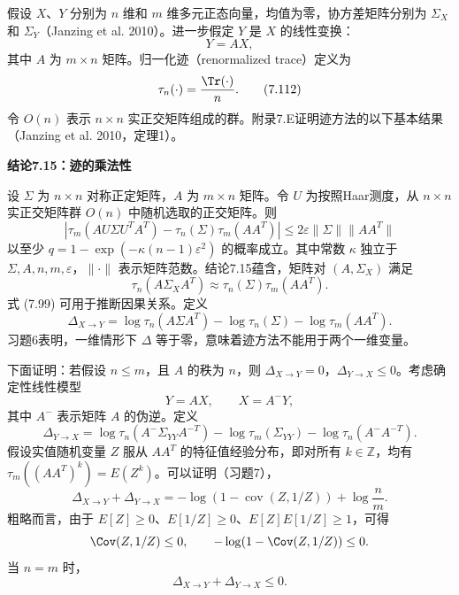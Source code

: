 假设 $X$、$Y$ 分别为 $n$ 维和 $m$ 维多元正态向量，均值为零，协方差矩阵分别为 $\Sigma_X$ 和 $\Sigma_Y$（Janzing et al. 2010）。进一步假定 $Y$ 是 $X$ 的线性变换：
\begin{equation}
Y=AX,
\tag{7.111}
\end{equation}
其中 $A$ 为 $m\times n$ 矩阵。归一化迹（renormalized trace）定义为
\begin{equation}
\tau_n(\cdot)=\frac{\Tr(\cdot)}n.
\tag{7.112}
\end{equation}
令 $O(n)$ 表示 $n\times n$ 实正交矩阵组成的群。附录7.E证明迹方法的以下基本结果（Janzing et al. 2010，定理1）。

\par\medskip{}\noindent\textbf{结论7.15：迹的乘法性}\par
设 $\Sigma$ 为 $n\times n$ 对称正定矩阵，$A$ 为 $m\times n$ 矩阵。令 $U$ 为按照Haar测度，从 $n\times n$ 实正交矩阵群 $O(n)$ 中随机选取的正交矩阵。则
\begin{equation}
\left|\tau_m(AU\Sigma U^TA^T)-\tau_n(\Sigma)\tau_m(AA^T)\right|
\le2\varepsilon\lVert\Sigma\rVert\lVert AA^T\rVert
\tag{7.113}
\end{equation}
以至少 $q=1-\exp(-\kappa(n-1)\varepsilon^2)$ 的概率成立。其中常数 $\kappa$ 独立于 $\Sigma,A,n,m,\varepsilon$，$\lVert\cdot\rVert$ 表示矩阵范数。结论7.15蕴含，矩阵对 $(A,\Sigma_X)$ 满足
\begin{equation}
\tau_n(A\Sigma_XA^T)\approx\tau_n(\Sigma)\tau_m(AA^T).
\tag{7.114}
\end{equation}
式 (7.99) 可用于推断因果关系。定义
\begin{equation}
\Delta_{X\to Y}=\log\tau_n(A\Sigma A^T)-\log\tau_n(\Sigma)-\log\tau_m(AA^T).
\tag{7.115}
\end{equation}
习题6表明，一维情形下 $\Delta$ 等于零，意味着迹方法不能用于两个一维变量。

下面证明：若假设 $n\le m$，且 $A$ 的秩为 $n$，则 $\Delta_{X\to Y}=0$，$\Delta_{Y\to X}\le0$。考虑确定性线性模型
\[
Y=AX,\qquad X=A^-Y,
\]
其中 $A^-$ 表示矩阵 $A$ 的伪逆。定义
\begin{equation}
\Delta_{Y\to X}=\log\tau_n(A^-\Sigma_{YY}A^{-T})
-\log\tau_m(\Sigma_{YY})-\log\tau_n(A^-A^{-T}).
\tag{7.116}
\end{equation}
假设实值随机变量 $Z$ 服从 $AA^T$ 的特征值经验分布，即对所有 $k\in\mathbb Z$，均有 $\tau_m((AA^T)^k)=E(Z^k)$。可以证明（习题7），
\begin{equation}
\Delta_{X\to Y}+\Delta_{Y\to X}
=-\log(1-\operatorname{cov}(Z,1/Z))+\log\frac nm.
\tag{7.117}
\end{equation}
粗略而言，由于 $E[Z]\ge0$、$E[1/Z]\ge0$、$E[Z]E[1/Z]\ge1$，可得
\[
\Cov(Z,1/Z)\le0,\qquad-\log(1-\Cov(Z,1/Z))\le0.
\]
当 $n=m$ 时，
\begin{equation}
\Delta_{X\to Y}+\Delta_{Y\to X}\le0.
\tag{7.118}
\end{equation}


